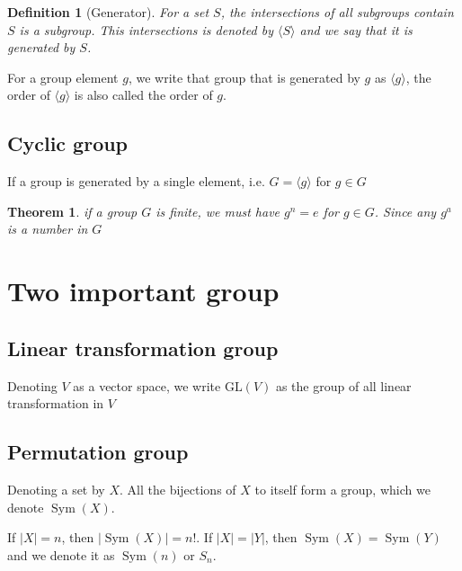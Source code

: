 \documentclass{amsart}
\newtheorem{definition}{Definition}
\newtheorem{theorem}{Theorem}
\DeclareMathOperator{\Sym}{Sym}
\begin{document}
\vspace{10pt}

\begin{definition}[Generator]
    For a set $S$, the intersections of all subgroups contain $S$ is a subgroup. This intersections is denoted by $\langle S\rangle$ and we say that it is generated by $S$. 
\end{definition}
For a group element $g$, we write that group that is generated by $g$ as $\langle g \rangle$, the order of $\langle g \rangle$ is also called the order of $g$. 

\subsection*{Cyclic group}
    If a group is generated by a single element, i.e. $G = \langle g \rangle$ for $g \in G$

\begin{theorem}
    if a group $G$ is finite, we must have $g^n = e$ for $g \in G$. Since any $g^a$ is a number in $G$
\end{theorem}


\section*{Two important group}

\subsection*{Linear transformation group}
Denoting $V$ as a vector space, we write $\text{GL}(V)$ as the group of all linear transformation in $V$

\subsection*{Permutation group}
Denoting a set by $X$. All the bijections of $X$ to itself form a group, which we denote $\Sym(X)$. 

If $|X| = n$, then $|\Sym(X)| = n!$.
If $|X| = |Y|$, then $\Sym(X) = \Sym(Y)$ and we denote it as $\Sym(n)$ or $S_n$.
\end{document}
